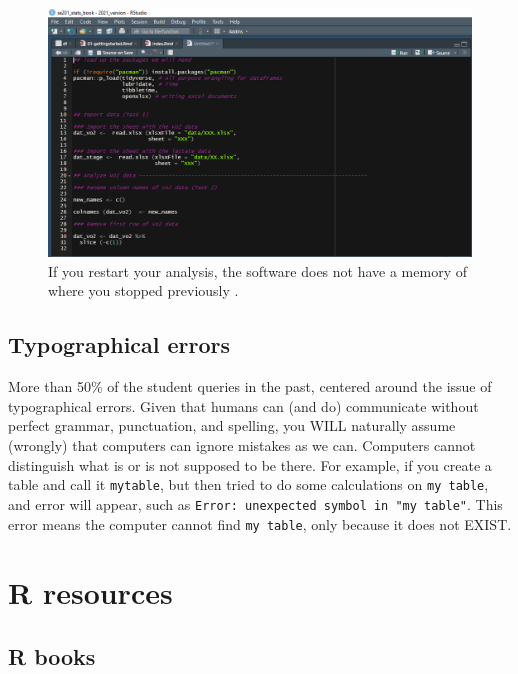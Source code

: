 \documentclass[
]{book}
\begin{document}
\begin{figure}

{\centering \includegraphics[width=14.49in]{images/index/runCodeStart} 

}

\caption{If you restart your analysis, the software does not have a memory of where you stopped previously .}\label{fig:codeStart}
\end{figure}

\hypertarget{typographical-errors}{%
\subsection{Typographical errors}\label{typographical-errors}}

More than 50\% of the student queries in the past, centered around the issue of typographical errors. Given that humans can (and do) communicate without perfect grammar, punctuation, and spelling, you WILL naturally assume (wrongly) that computers can ignore mistakes as we can. Computers cannot distinguish what is or is not supposed to be there. For example, if you create a table and call it \texttt{mytable}, but then tried to do some calculations on \texttt{my\ table}, and error will appear, such as \texttt{Error:\ unexpected\ symbol\ in\ "my\ table"}. This error means the computer cannot find \texttt{my\ table}, only because it does not EXIST.

\hypertarget{r-resources}{%
\section{R resources}\label{r-resources}}

\hypertarget{r-books}{%
\subsection{R books}\label{r-books}}
\end{document}
